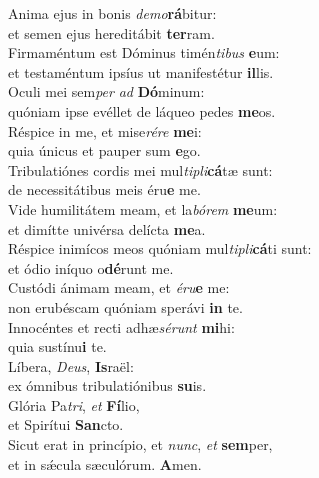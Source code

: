 \evenverse Anima ejus in bonis \textit{de}\textit{mo}\textbf{rá}bitur:~\*\\
\evenverse et semen ejus hereditábit \textbf{ter}ram.\\
\oddverse Firmaméntum est Dóminus timén\textit{ti}\textit{bus} \textbf{e}um:~\*\\
\oddverse et testaméntum ipsíus ut manifestétur \textbf{il}lis.\\
\evenverse Oculi mei sem\textit{per} \textit{ad} \textbf{Dó}minum:~\*\\
\evenverse quóniam ipse evéllet de láqueo pedes \textbf{me}os.\\
\oddverse Réspice in me, et mise\textit{ré}\textit{re} \textbf{me}i:~\*\\
\oddverse quia únicus et pauper sum \textbf{e}go.\\
\evenverse Tribulatiónes cordis mei mul\textit{ti}\textit{pli}\textbf{cá}tæ sunt:~\*\\
\evenverse de necessitátibus meis éru\textbf{e} me.\\
\oddverse Vide humilitátem meam, et la\textit{bó}\textit{rem} \textbf{me}um:~\*\\
\oddverse et dimítte univérsa delícta \textbf{me}a.\\
\evenverse Réspice inimícos meos quóniam mul\textit{ti}\textit{pli}\textbf{cá}ti sunt:~\*\\
\evenverse et ódio iníquo o\textbf{dé}runt me.\\
\oddverse Custódi ánimam meam, et \textit{é}\textit{ru}\textbf{e} me:~\*\\
\oddverse non erubéscam quóniam sperávi \textbf{in} te.\\
\evenverse Innocéntes et recti adhæ\textit{sé}\textit{runt} \textbf{mi}hi:~\*\\
\evenverse quia sustínu\textbf{i} te.\\
\oddverse Líbera, \textit{De}\textit{us}, \textbf{Is}raël:~\*\\
\oddverse ex ómnibus tribulatiónibus \textbf{su}is.\\
\evenverse Glória Pa\textit{tri}, \textit{et} \textbf{Fí}lio,~\*\\
\evenverse et Spirítui \textbf{San}cto.\\
\oddverse Sicut erat in princípio, et \textit{nunc}, \textit{et} \textbf{sem}per,~\*\\
\oddverse et in sǽcula sæculórum. \textbf{A}men.\\
